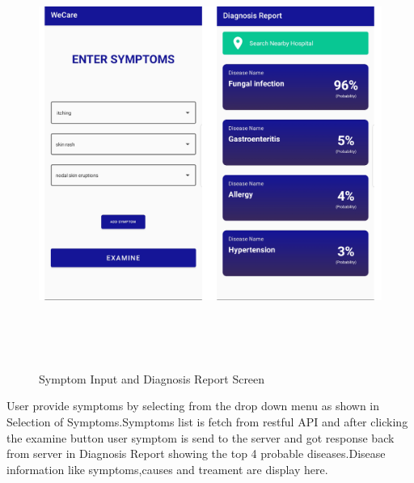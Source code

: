 {\begin{figure}[H]
\begin{center}
\includegraphics[width=155mm, height = 140mm]{Outputnew/2.png}
\caption{Symptom Input and Diagnosis Report Screen}
\end{center}
\end{figure}

User provide symptoms by selecting from the drop down menu as shown in Selection of Symptoms.Symptoms list is fetch from restful API and after clicking the examine button user symptom is send to the server and got response back from server in Diagnosis Report showing the top 4 probable diseases.Disease information like symptoms,causes and treament are display here.

}
